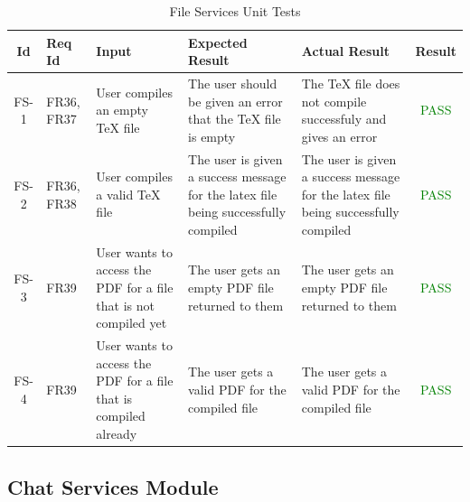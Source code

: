 \documentclass[12pt, titlepage]{article}
\begin{document}
\begin{center}
    \begin{longtable}{|c|p{1cm}|p{2.7cm}|p{3cm}|p{3cm}|c|}
        \caption{File Services Unit Tests \label{long}}\\
        \hline
        \textbf{Id} & \textbf{Req Id} & \textbf{Input} & \textbf{Expected Result} & \textbf{Actual Result} & \textbf{Result}   \\
        \hline
        FS-1 & FR36, FR37 & User compiles an empty TeX file & The user should be given an error that the TeX file is empty & The TeX file does not compile successfuly and gives an error &  \textcolor{green}{PASS} \\
        \hline
        FS-2 & FR36, FR38 & User compiles a valid TeX file & The user is given a success message for the latex file being successfully compiled & The user is given a success message for the latex file being successfully compiled &  \textcolor{green}{PASS} \\
        \hline
        FS-3 & FR39 & User wants to access the PDF for a file that is not compiled yet & The user gets an empty PDF file returned to them & The user gets an empty PDF file returned to them &  \textcolor{green}{PASS} \\
        \hline
        FS-4 & FR39 &  User wants to access the PDF for a file that is compiled already & The user gets a valid PDF for the compiled file & The user gets a valid PDF for the compiled file &  \textcolor{green}{PASS} \\
        \hline
    \end{longtable}
\end{center}

\subsection{Chat Services Module}
\end{document}
